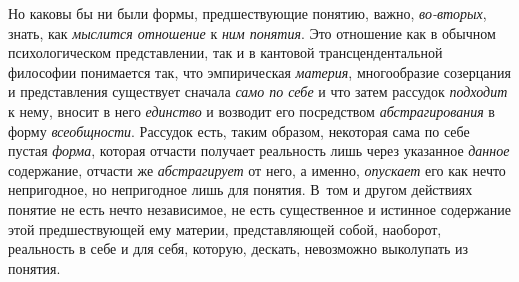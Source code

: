 {Но каковы бы ни были формы, предшествующие понятию, важно,
{\em во-вторых}, знать,
как {\em мыслится отношение}
к {\em ним понятия}.
Это отношение как в обычном психологическом представлении,
так и в кантовой трансцендентальной философии понимается так, что
эмпирическая {\em материя},
многообразие созерцания и представления существует сначала
{\em само по себе} и что
затем рассудок {\em подходит}
к нему, вносит в него
{\em единство} и возводит
его посредством {\em абстрагирования}
в форму
{\em всеобщности}.
Рассудок есть, таким образом, некоторая сама
по себе пустая {\em форма},
которая отчасти получает реальность лишь через указанное
{\em данное} содержание,
отчасти же {\em абстрагирует}
от него, а именно,
{\em опускает} его как
нечто непригодное, но непригодное лишь для понятия. В~том и другом
действиях понятие не есть нечто независимое, не есть существенное и
истинное содержание этой предшествующей ему материи, представляющей собой,
наоборот, реальность в себе и для себя, которую, дескать, невозможно
выколупать из понятия.

}
